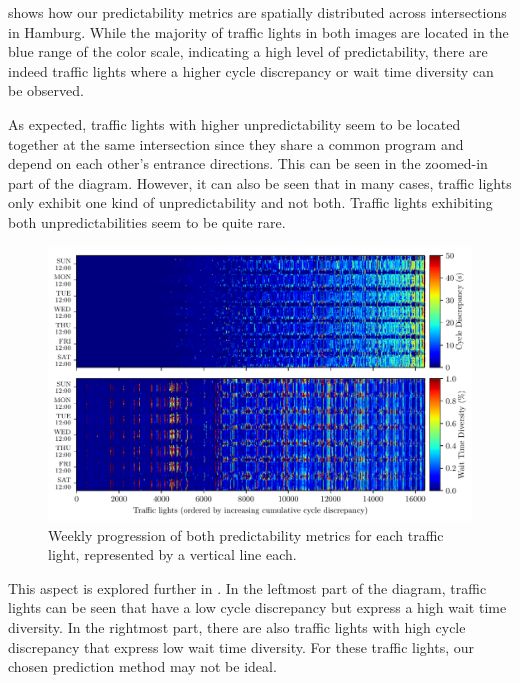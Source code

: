  shows how our predictability metrics are spatially distributed across intersections in Hamburg. While the majority of traffic lights in both images are located in the blue range of the color scale, indicating a high level of predictability, there are indeed traffic lights where a higher cycle discrepancy or wait time diversity can be observed. 

As expected, traffic lights with higher unpredictability seem to be located together at the same intersection since they share a common program and depend on each other's entrance directions. This can be seen in the zoomed-in part of the diagram. However, it can also be seen that in many cases, traffic lights only exhibit one kind of unpredictability and not both. Traffic lights exhibiting both unpredictabilities seem to be quite rare.

\begin{figure}[!t]
    \centering
    \includegraphics[width=\linewidth]{images/predictability-week-heatmap-per-thing.pdf}
    \caption{Weekly progression of both predictability metrics for each traffic light, represented by a vertical line each.}\label{fig:predictability-week-heatmap-per-thing}
\end{figure}

This aspect is explored further in . In the leftmost part of the diagram, traffic lights can be seen that have a low cycle discrepancy but express a high wait time diversity. In the rightmost part, there are also traffic lights with high cycle discrepancy that express low wait time diversity. For these traffic lights, our chosen prediction method may not be ideal. 

